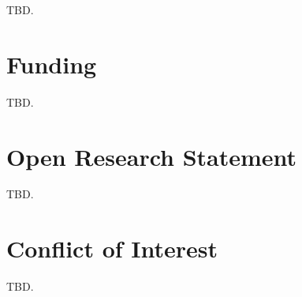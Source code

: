 \acknowledgments
TBD.

\section*{Funding}
TBD.

\section*{Open Research Statement}
TBD.

\section*{Conflict of Interest}
TBD.

